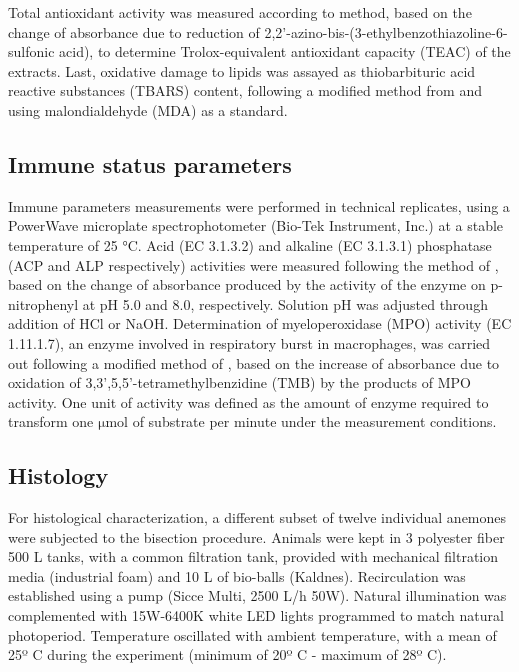\documentclass[final,3p,times,authoryear]{elsarticle}
\begin{document}
Total antioxidant activity was measured according to \citet{Erel2004} method, based on the change of absorbance due to reduction of 2,2'-azino-bis-(3-ethylbenzothiazoline-6-sulfonic acid), to determine Trolox-equivalent antioxidant capacity (TEAC) of the extracts. Last, oxidative damage to lipids was assayed as thiobarbituric acid reactive substances (TBARS) content, following a modified method from \citet{Buege1978} and using malondialdehyde (MDA) as a standard. 


\subsection{Immune status parameters}
\label{subsec3}

Immune parameters measurements were performed in technical replicates, using a PowerWave microplate spectrophotometer (Bio-Tek Instrument, Inc.) at a stable temperature of 25 °C. Acid (EC 3.1.3.2) and alkaline (EC 3.1.3.1) phosphatase (ACP and ALP respectively) activities were measured following the method of \citet{Huang2011}, based on the change of absorbance produced by the activity of the enzyme on p-nitrophenyl at pH 5.0 and 8.0, respectively. Solution pH was adjusted through addition of HCl or NaOH. Determination of myeloperoxidase (MPO) activity (EC 1.11.1.7), an enzyme involved in respiratory burst in macrophages, was carried out following a modified method of \citet{Mohanty2010}, based on the increase of absorbance due to oxidation of 3,3',5,5'-tetramethylbenzidine (TMB) by the products of MPO activity. One unit of activity was defined as the amount of enzyme required to transform one $\mathrm{\mu}$mol of substrate per minute under the measurement conditions.  

\subsection{Histology}
\label{subsec4}

For histological characterization, a different subset of twelve individual anemones were subjected to the bisection procedure. Animals were kept in 3 polyester fiber 500 L tanks, with a common filtration tank, provided with mechanical filtration media (industrial foam) and 10 L of bio-balls (Kaldnes). Recirculation was established using a pump (Sicce Multi, 2500 L/h 50W). Natural illumination was complemented with 15W-6400K white LED lights programmed to match natural photoperiod. Temperature oscillated with ambient temperature, with a mean of 25º C during the experiment (minimum of 20º C - maximum of 28º C).
\end{document}
